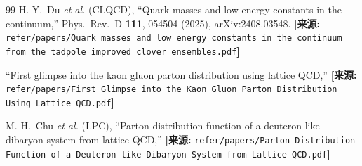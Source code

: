 \documentclass[12pt,a4paper]{ctexart}
\theoremstyle{definition}
\begin{document}
\begin{thebibliography}{99}
H.-Y.~Du \textit{et al.} (CLQCD),
``Quark masses and low energy constants in the continuum,''
Phys.\ Rev.\ D \textbf{111}, 054504 (2025), arXiv:2408.03548.
\quad\textbf{[来源:} \texttt{refer/papers/Quark masses and low energy constants in the continuum from the tadpole improved clover ensembles.pdf}\textbf{]}

``First glimpse into the kaon gluon parton distribution using lattice QCD,''
\quad\textbf{[来源:} \texttt{refer/papers/First Glimpse into the Kaon Gluon Parton Distribution Using Lattice QCD.pdf}\textbf{]}

M.-H.~Chu \textit{et al.} (LPC),
``Parton distribution function of a deuteron-like dibaryon system from lattice QCD,''
\quad\textbf{[来源:} \texttt{refer/papers/Parton Distribution Function of a Deuteron-like Dibaryon System from Lattice QCD.pdf}\textbf{]}

\end{thebibliography}
\end{document}
